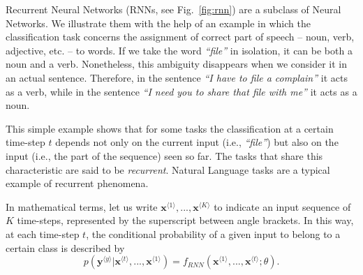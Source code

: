 Recurrent Neural Networks (RNNs, see Fig.~\ref{fig:rnn}) are a subclass of Neural Networks. We
illustrate them with the help of an example in which the
classification task concerns the assignment of correct part of speech -- noun, verb, adjective, etc. --
to words.  If we take the word \emph{``file''} in isolation,
it can be both a noun and a verb. Nonetheless, this ambiguity
disappears when we consider it in an actual sentence. Therefore, in the
sentence \emph{``I have to file a complain''} it acts as a verb, while
in the sentence \emph{``I need you to share that file with me''} it
acts as a noun.

This simple example shows that for some tasks the classification at a
certain time-step $t$ depends not only on the current input (i.e.,
\emph{``file''}) but also on the input (i.e., the part of the
sequence) seen so far. The tasks that share this characteristic are
said to be \emph{recurrent}. Natural Language tasks are a typical
example of recurrent phenomena.

In mathematical terms, let us write
$\mathbf{x}^{\langle 1 \rangle}, ..., \mathbf{x}^{\langle K \rangle}$
to indicate an input sequence of $K$ time-steps, represented by the
superscript between angle brackets. In this way, at each time-step $t$,
the conditional probability of a given input to belong to a certain class is described by
%
\begin{equation}
\label{eq:condprobrec}
  p(\mathbf{y}^{\langle y \rangle}|\mathbf{x}^{\langle t \rangle}, ..., \mathbf{x}^{\langle 1 \rangle}) = f_{\mathit{RNN}}(\mathbf{x}^{\langle 1 \rangle}, ..., \mathbf{x}^{\langle t \rangle}; \theta).
\end{equation}
%

